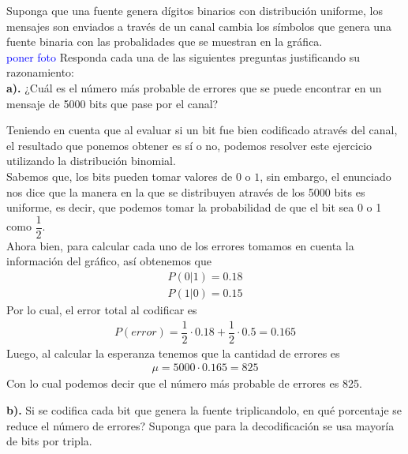 
Suponga que una fuente genera dígitos binarios con distribución uniforme, los mensajes son enviados a través de un canal cambia los símbolos que genera una fuente binaria con las probalidades que se muestran en la gráfica.\\
\textcolor{blue}{poner foto}
Responda cada una de las siguientes preguntas justificando su razonamiento:\\
\textbf{a).} ¿Cuál es el número más probable de errores que se puede encontrar en un mensaje de 5000 bits que pase por el canal?\\
\begin{sol}
   Teniendo en cuenta que al evaluar si un bit fue bien codificado através del canal, el resultado que ponemos obtener es sí o no, podemos resolver este ejercicio utilizando la distribución binomial.\\
   Sabemos que, los bits pueden tomar valores de $0$ o $1$, sin embargo, el enunciado nos dice que la manera en la que se distribuyen através de los 5000 bits es uniforme, es decir, que podemos tomar la probabilidad de que el bit sea 0 o 1 como $\dfrac{1}{2}.$ \\
   Ahora bien, para calcular cada uno de los errores tomamos en cuenta la información del gráfico, así obtenemos que
   \begin{align*}
       P(0|1)=0.18\\
       P(1|0)=0.15
   \end{align*}
Por lo cual, el error total al codificar es 
\begin{align*}
    P(error)=\dfrac{1}{2}\cdot 0.18+\dfrac{1}{2}\cdot 0.5=0.165
\end{align*}
Luego, al calcular la esperanza tenemos que la cantidad de errores es
\begin{align*}
\mu=5000\cdot 0.165=825
\end{align*}
Con lo cual podemos decir que el número más probable de errores es 825.
\end{sol}
\textbf{b).} Si se codifica cada bit que genera la fuente triplicandolo, en qué porcentaje se reduce el número de errores? Suponga que para la decodificación se usa mayoría de bits por tripla.\\
